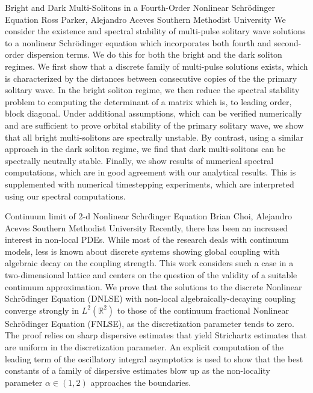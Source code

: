 \vspace{1.5ex}
\abs
{Bright and Dark Multi-Solitons in a Fourth-Order Nonlinear Schr\"odinger Equation}
{Ross Parker, Alejandro Aceves}
{Southern Methodist University}
{We consider the existence and spectral stability of multi-pulse solitary wave solutions to a nonlinear Schr\"odinger equation which incorporates both fourth and second-order dispersion terms. We do this for both the bright and the dark soliton regimes. We first show that a discrete family of multi-pulse solutions exists, which is characterized by the distances between consecutive copies of the the primary solitary wave. In the bright soliton regime, we then reduce the spectral stability problem to computing the determinant of a matrix which is, to leading order, block diagonal. Under additional assumptions, which can be verified numerically and are sufficient to prove orbital stability of the primary solitary wave, we show that all bright multi-solitons are spectrally unstable. By contrast, using a similar approach in the dark soliton regime, we find that dark multi-solitons can be spectrally neutrally stable. Finally, we show results of numerical spectral computations, which are in good agreement with our analytical results. This is supplemented with numerical timestepping experiments, which are interpreted using our spectral computations.}


\vspace{1.5ex}
\abs
{Continuum limit of 2-d Nonlinear Schr\"dinger Equation}
{Brian Choi, Alejandro Aceves}
{Southern Methodist University}
{Recently, there has been an increased interest in non-local PDEs. While most of the research deals with continuum models, less is known about discrete systems showing global coupling with algebraic decay on the coupling strength. This work considers such a case in a two-dimensional lattice and centers on the question of the validity of a suitable continuum approximation. We prove that the solutions to the discrete Nonlinear Schr\"odinger Equation (DNLSE) with non-local algebraically-decaying coupling converge strongly in $L^2(\mathbb{R}^2)$ to those of the continuum fractional Nonlinear Schr\"odinger Equation (FNLSE), as the discretization parameter tends to zero. The proof relies on sharp dispersive estimates that yield Strichartz estimates that are uniform in the discretization parameter. An explicit computation of the leading term of the oscillatory integral asymptotics is used to show that the best constants of a family of dispersive estimates blow up as the non-locality parameter $\alpha \in (1,2)$ approaches the boundaries.}


